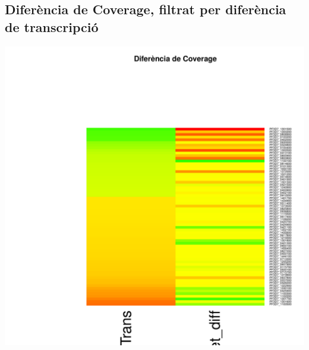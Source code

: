 \documentclass{article}\usepackage[]{graphicx}\usepackage[]{color}
\newenvironment{knitrout}{}{} %
\begin{document}
\subsection{Diferència de Coverage, filtrat per diferència de transcripció}
\begin{knitrout}
\color{fgcolor}

{\centering \includegraphics[width=.9\linewidth]{figure/minimal-_heat_cov_diff-1} 

}



\end{knitrout}
\clearpage
\end{document}

